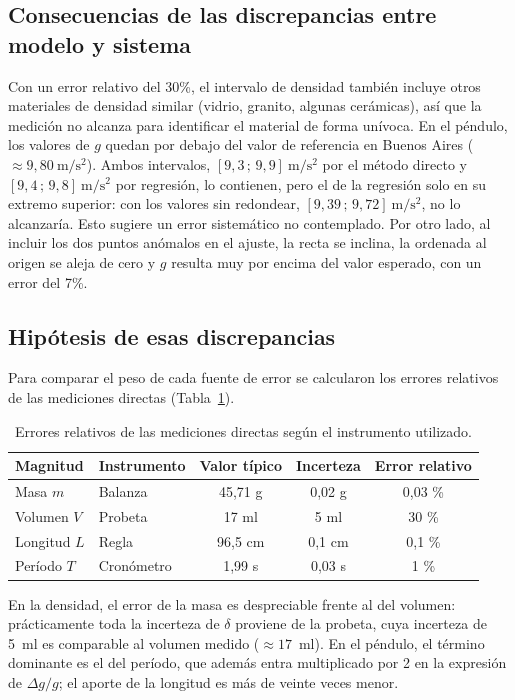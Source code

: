 \documentclass[12pt,a4paper]{article}
\newcommand{\hdr}[1]{\textbf{#1}}
\begin{document}
\subsection{Consecuencias de las discrepancias entre modelo y sistema}
Con un error relativo del 30\%, el intervalo de densidad también incluye otros materiales de
densidad similar (vidrio, granito, algunas cerámicas), así que la medición no alcanza para
identificar el material de forma unívoca. En el péndulo, los valores de $g$ quedan por
debajo del valor de referencia en Buenos Aires ($\approx 9{,}80\ \mathrm{m/s^2}$). Ambos
intervalos, $[9{,}3\,;\,9{,}9]\ \mathrm{m/s^2}$ por el método directo y
$[9{,}4\,;\,9{,}8]\ \mathrm{m/s^2}$ por regresión, lo contienen, pero el de la regresión solo
en su extremo superior: con los valores sin redondear, $[9{,}39\,;\,9{,}72]\ \mathrm{m/s^2}$,
no lo alcanzaría. Esto sugiere un error sistemático no contemplado. Por otro lado, al incluir los
dos puntos anómalos en el ajuste, la recta se inclina, la ordenada al origen se aleja de cero
y $g$ resulta muy por encima del valor esperado, con un error del 7\%.

\subsection{Hipótesis de esas discrepancias}
Para comparar el peso de cada fuente de error se calcularon los errores relativos de las
mediciones directas (Tabla~\ref{tab:errores}).

\begin{table}[htbp]
\centering
\small
\caption{Errores relativos de las mediciones directas según el instrumento utilizado.}
\label{tab:errores}
\begin{tabular}{llccc}
  \toprule
  \hdr{Magnitud} & \hdr{Instrumento} & \hdr{Valor típico} & \hdr{Incerteza} & \hdr{Error relativo} \\ \midrule
  Masa $m$      & Balanza    & 45,71 g  & 0,02 g  & 0,03 \% \\
  Volumen $V$   & Probeta    & 17 ml    & 5 ml    & 30 \%   \\
  Longitud $L$  & Regla      & 96,5 cm  & 0,1 cm  & 0,1 \%  \\
  Período $T$   & Cronómetro & 1,99 s   & 0,03 s  & 1 \%    \\
  \bottomrule
\end{tabular}
\end{table}

En la densidad, el error de la masa es despreciable frente al del volumen: prácticamente toda
la incerteza de $\delta$ proviene de la probeta, cuya incerteza de 5~ml es comparable al
volumen medido ($\approx 17$~ml). En el péndulo, el término dominante es el del período, que
además entra multiplicado por 2 en la expresión de $\Delta g/g$; el aporte de la longitud es
más de veinte veces menor.
\end{document}
